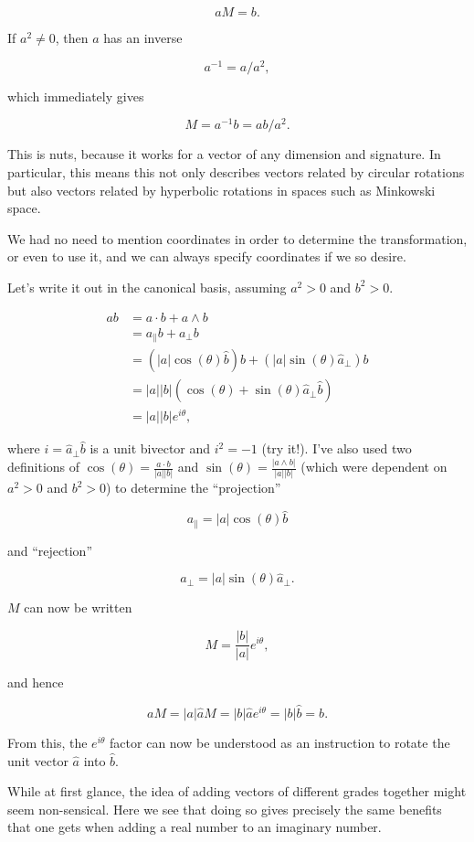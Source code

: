\documentclass{article}
\begin{document}
$$a M = b.$$

If $a^2 \not = 0$, then $a$ has an inverse

$$a^{-1} = a / a^2,$$

which immediately gives

$$M = a^{-1} b = ab / a^2.$$

This is nuts, because it works for a vector of any dimension and signature. In particular, this means this not only describes vectors related by circular rotations but also vectors related by hyperbolic rotations in spaces such as Minkowski space.

We had no need to mention coordinates in order to determine the transformation, or even to use it, and we can always specify coordinates if we so desire.

Let's write it out in the canonical basis, assuming $a^2 > 0$ and $b^2 > 0$.

\begin{align}
  ab &= a \cdot b + a \wedge b \\
     &= a_\parallel b + a_\perp b \\
     &= (|a| \cos(\theta) \hat b) b + (|a| \sin(\theta) \hat a_\perp) b \\
     &= |a||b|(\cos(\theta) + \sin(\theta) \hat a_\perp \hat b )\\
     &= |a||b| e^{i \theta},
\end{align}

where $i = \hat a_\perp \hat b$ is a unit bivector and $i^2 = -1$ (try it!). I've also used two definitions of $\cos(\theta) = \frac{a \cdot b}{|a||b|}$ and $\sin(\theta) = \frac{|a \wedge b|}{|a||b|}$ (which were dependent on $a^2 >0$ and $b^2 > 0$) to determine the ``projection''

$$a_\parallel = |a| \cos(\theta) \hat b$$ 

and ``rejection''

$$a_\perp = |a| \sin(\theta) \hat a_\perp.$$

$M$ can now be written

$$M = \frac{|b|}{|a|} e^{i \theta},$$

and hence

$$a M = |a| \hat a M = |b| \hat a e^{i \theta} = |b| \hat b = b.$$

From this, the $e^{i \theta}$ factor can now be understood as an instruction to rotate the unit vector $\hat a$ into $\hat b$.

While at first glance, the idea of adding vectors of different grades together might seem non-sensical. Here we see that doing so gives precisely the same benefits that one gets when adding a real number to an imaginary number.
\end{document}
